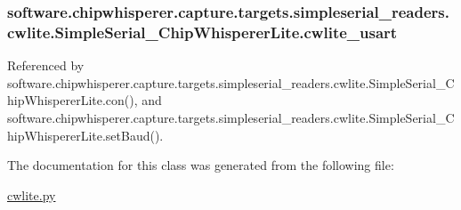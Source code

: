 \subsubsection[{cwlite\+\_\+usart}]{\setlength{\rightskip}{0pt plus 5cm}software.\+chipwhisperer.\+capture.\+targets.\+simpleserial\+\_\+readers.\+cwlite.\+Simple\+Serial\+\_\+\+Chip\+Whisperer\+Lite.\+cwlite\+\_\+usart}\label{classsoftware_1_1chipwhisperer_1_1capture_1_1targets_1_1simpleserial__readers_1_1cwlite_1_1SimpleSerial__ChipWhispererLite_a9c2060c999bfecfbd635ce557c764293}


Referenced by software.\+chipwhisperer.\+capture.\+targets.\+simpleserial\+\_\+readers.\+cwlite.\+Simple\+Serial\+\_\+\+Chip\+Whisperer\+Lite.\+con(), and software.\+chipwhisperer.\+capture.\+targets.\+simpleserial\+\_\+readers.\+cwlite.\+Simple\+Serial\+\_\+\+Chip\+Whisperer\+Lite.\+set\+Baud().



The documentation for this class was generated from the following file\+:\begin{DoxyCompactItemize}
\item 
\hyperlink{cwlite_8py}{cwlite.\+py}\end{DoxyCompactItemize}

